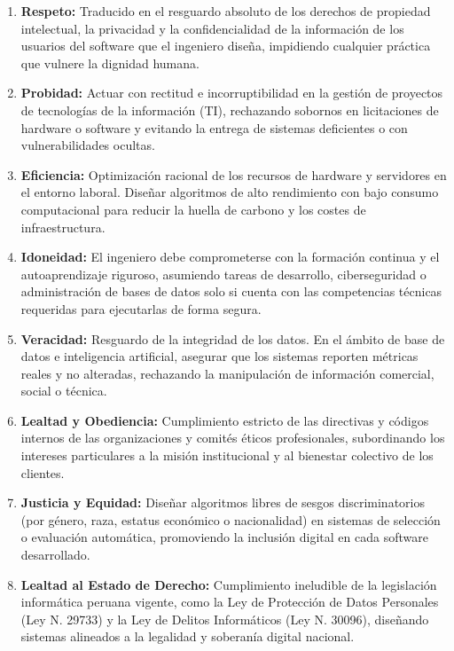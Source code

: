 \documentclass[12pt,a4paper]{article}
\begin{document}
\begin{enumerate}
    \item \textbf{Respeto:} Traducido en el resguardo absoluto de los derechos de propiedad intelectual, la privacidad y la confidencialidad de la información de los usuarios del software que el ingeniero diseña, impidiendo cualquier práctica que vulnere la dignidad humana.
    \item \textbf{Probidad:} Actuar con rectitud e incorruptibilidad en la gestión de proyectos de tecnologías de la información (TI), rechazando sobornos en licitaciones de hardware o software y evitando la entrega de sistemas deficientes o con vulnerabilidades ocultas.
    \item \textbf{Eficiencia:} Optimización racional de los recursos de hardware y servidores en el entorno laboral. Diseñar algoritmos de alto rendimiento con bajo consumo computacional para reducir la huella de carbono y los costes de infraestructura.
    \item \textbf{Idoneidad:} El ingeniero debe comprometerse con la formación continua y el autoaprendizaje riguroso, asumiendo tareas de desarrollo, ciberseguridad o administración de bases de datos solo si cuenta con las competencias técnicas requeridas para ejecutarlas de forma segura.
    \item \textbf{Veracidad:} Resguardo de la integridad de los datos. En el ámbito de base de datos e inteligencia artificial, asegurar que los sistemas reporten métricas reales y no alteradas, rechazando la manipulación de información comercial, social o técnica.
    \item \textbf{Lealtad y Obediencia:} Cumplimiento estricto de las directivas y códigos internos de las organizaciones y comités éticos profesionales, subordinando los intereses particulares a la misión institucional y al bienestar colectivo de los clientes.
    \item \textbf{Justicia y Equidad:} Diseñar algoritmos libres de sesgos discriminatorios (por género, raza, estatus económico o nacionalidad) en sistemas de selección o evaluación automática, promoviendo la inclusión digital en cada software desarrollado.
    \item \textbf{Lealtad al Estado de Derecho:} Cumplimiento ineludible de la legislación informática peruana vigente, como la Ley de Protección de Datos Personales (Ley N.{\circ} 29733) y la Ley de Delitos Informáticos (Ley N.{\circ} 30096), diseñando sistemas alineados a la legalidad y soberanía digital nacional.
\end{enumerate}
\end{document}
